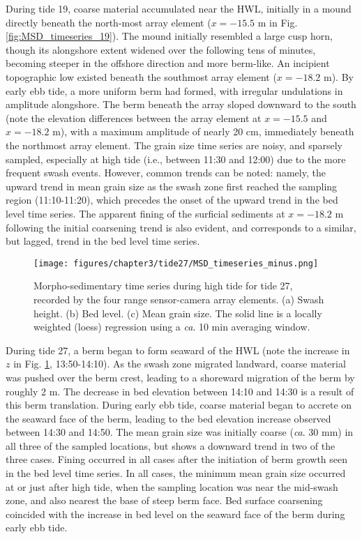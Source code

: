 During tide 19, coarse material accumulated near the HWL, initially in a mound directly beneath the north-most array element ($x=-15.5$ m in Fig. \ref{fig:MSD_timeseries_19}). The mound initially resembled a large cusp horn, though its alongshore extent widened over the following tens of minutes, becoming steeper in the offshore direction and more berm-like. An incipient topographic low existed beneath the southmost array element ($x=-18.2$ m). By early ebb tide, a more uniform berm had formed, with irregular undulations in amplitude alongshore. The berm beneath the array sloped downward to the south (note the elevation differences between the array element at $x=-15.5$ and $x=-18.2$ m), with a maximum amplitude of nearly 20 cm, immediately beneath the northmost array element. The grain size time series are noisy, and sparsely sampled, especially at high tide (i.e., between 11:30 and 12:00) due to the more frequent swash events. However, common trends can be noted: namely, the upward trend in mean grain size as the swash zone first reached the sampling region (11:10-11:20), which precedes the onset of the upward trend in the bed level time series. The apparent fining of the surficial sediments at $x=-18.2$ m following the initial coarsening trend is also evident, and corresponds to a similar, but lagged, trend in the bed level time series.

\begin{figure}[tbp] %
  	\texttt{[image: figures/chapter3/tide27/MSD\_timeseries\_minus.png]}
 	\caption[Time series of swash zone bed level and mean grain size, tide 27]{Morpho-sedimentary time series during high tide for tide 27, recorded by the four range sensor-camera array elements. (a) Swash height. (b) Bed level. (c) Mean grain size. The solid line is a locally weighted (loess) regression using a \textit{ca}. 10 min averaging window.}
 	\label{fig:MSD_timeseries_27}
\end{figure}

During tide 27, a berm began to form seaward of the HWL (note the increase in $z$ in Fig. \ref{fig:MSD_timeseries_27}, 13:50-14:10). As the swash zone migrated landward, coarse material was pushed over the berm crest, leading to a shoreward migration of the berm by roughly 2 m. The decrease in bed elevation between 14:10 and 14:30 is a result of this berm translation. During early ebb tide, coarse material began to accrete on the seaward face of the berm, leading to the bed elevation increase observed between 14:30 and 14:50. The mean grain size was initially coarse (\textit{ca}. 30 mm) in all three of the sampled locations, but shows a downward trend in two of the three cases. Fining occurred in all cases after the initiation of berm growth seen in the bed level time series. In all cases, the minimum mean grain size occurred at or just after high tide, when the sampling location was near the mid-swash zone, and also nearest the base of steep berm face. Bed surface coarsening coincided with the increase in bed level on the seaward face of the berm during early ebb tide.

